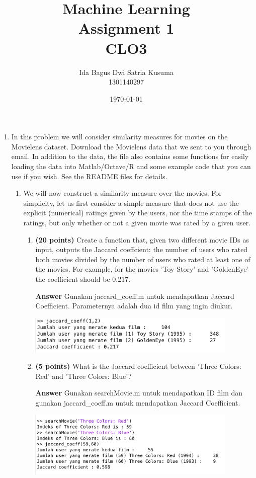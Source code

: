 \documentclass[12pt]{article}%
\begin{document}
\title{Machine Learning \protect\\ Assignment 1 \protect\\ CLO3} 
\author{Ida Bagus Dwi Satria Kusuma \protect\\ 1301140297}
\date{\today}
\maketitle

\begin{enumerate}
	\item In this problem we will consider similarity measures for movies on the Movielens dataset.
Download the Movielens data that we sent to you through email. In addition to the data, the file also contains some functions for easily loading the data into Matlab/Octave/R and some example code that you can use if you wish. See the README files for details.
	\begin{enumerate}	
		\item We will now construct a similarity measure over the movies. For simplicity, let us first consider a simple measure that does not use the explicit (numerical) ratings given by the users, nor the time stamps of the ratings, but only whether or not a given movie was rated by a given user. 
		\begin{enumerate}
			\item \textbf{(20 points)} Create a function that, given two different movie IDs as input, outputs the Jaccard coeffcient: the number of users who rated both movies divided by the number of users who rated at least one of the movies. For example, for the movies 'Toy Story' and 'GoldenEye' the coefficient should be 0.217.

			\par \textbf{Answer} Gunakan jaccard\_coeff.m untuk mendapatkan Jaccard Coefficient. Parameternya adalah dua id film yang ingin diukur.
			\par \includegraphics[width=10cm]{ss_13ai}

			\item \textbf{(5 points)} What is the Jaccard coefficient between 'Three Colors: Red' and 'Three Colors: Blue'?

			\par \textbf{Answer} Gunakan searchMovie.m untuk mendapatkan ID film dan gunakan jaccard\_coeff.m untuk mendapatkan Jaccard Coefficient.
			\par \includegraphics[width=10cm]{ss_13aii}


\end{enumerate}
\end{enumerate}
\end{enumerate}
\end{document}
